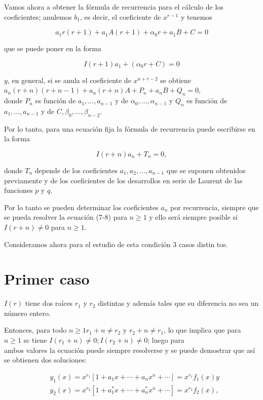\documentclass[10pt]{article}
\theoremstyle{plain}
\theoremstyle{definition}
\theoremstyle{remark}
\begin{document}
Vamos ahora a obtener la fórmula de recurrencia para el cálculo de los coeficientes; anulemos $b_{1}$, es decir, el coeficiente de $x^{r-1}$ y tenemos

$$
a_{1} r(r+1)+a_{1} A(r+1)+\alpha_{0} r+a_{1} B+C=0
$$

que se puede poner en la forma

$$
I(r+1) a_{1}+\left(\alpha_{0} r+C\right)=0
$$

$y$, en general, si se anula el coeficiente de $x^{n+r-2}$ se obtiene\\
$a_{n}(r+n)(r+n-1)+a_{n}(r+n) A+P_{n}+a_{n} B+Q_{n}=0$,\\
donde $P_{n}$ es función de $a_{1}, \ldots, a_{n-1}$ y de $\alpha_{0}, \ldots, \alpha_{n-1}$ y $Q_{n}$ es función de $a_{1}, \ldots, a_{n-1}$ y de $C, \beta_{0}, \ldots, \beta_{n-2}$.

Por lo tanto, para una ecuación fija la fórmula de recurrencia puede escribirse en la forma


\begin{equation*}
I(r+n) a_{n}+T_{n}=0, \tag{7-8}
\end{equation*}


donde $T_{n}$ depende de los coeficientes $a_{1}, a_{2}, \ldots, a_{n-1}$ que se suponen obtenidos previamente y de los coeficientes de los desarrollos en serie de Laurent de las funciones $p$ y $q$.

Por lo tanto se pueden determinar los coeficientes $a_{n}$ por recurrencia, siempre que se pueda resolver la ecuación (7-8) para $n \geqslant 1$ y ello será siempre posible si $I(r+n) \neq 0$ para $n \geqslant 1$.

Consideramos ahora para el estudio de esta condición 3 casos distin tos.

\section*{Primer caso}
$I(r)$ tiene dos raíces $r_{1}$ y $r_{2}$ distintas y además tales que su diferencia no sea un número entero.

Entonces, para todo $n \geqslant 1 r_{1}+n \neq r_{2}$ y $r_{2}+n \neq r_{1}$, lo que implica que para $n \geqslant 1$ sc tiene $I\left(r_{1}+n\right) \neq 0 ; I\left(r_{2}+n\right) \neq 0$; luego para\\
ambos valores la ecuación puede siempre resolverse y se puede demostrar que así se obtienen dos soluciones:

$$
\begin{aligned}
& y_{1}(x)=x^{r_{1}}\left[1+a_{1} x+\cdots+a_{n} x^{n}+\cdots\right]=x^{r_{1}} f_{1}(x) y \\
& y_{2}(x)=x^{r_{2}}\left[1+a_{1}^{*} x+\cdots+a_{n}^{*} x^{n}+\cdots\right]=x^{r_{2}} f_{2}(x),
\end{aligned}
$$
\end{document}
